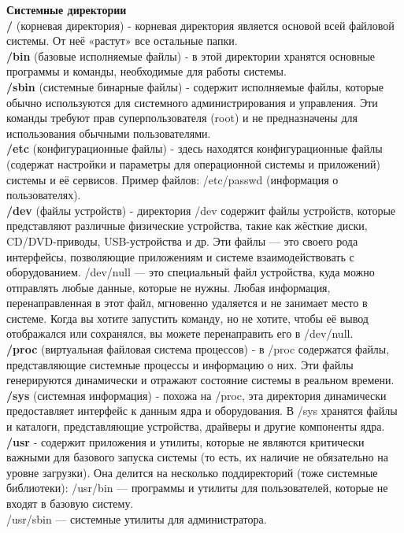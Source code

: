 \noindent \textbf{Системные директории} \\
\textbf{/} (корневая директория) -  корневая директория является основой всей файловой системы. От неё «растут» все остальные папки. \\
\textbf{/bin} (базовые исполняемые файлы) - в этой директории хранятся основные программы и команды, необходимые для работы системы. \\
\textbf{/sbin} (системные бинарные файлы) - содержит исполняемые файлы, которые обычно используются для системного администрирования и управления. Эти команды требуют прав суперпользователя (root) и не предназначены для использования обычными пользователями. \\
\textbf{/etc} (конфигурационные файлы) - здесь находятся конфигурационные файлы (содержат настройки и параметры для операционной системы и приложений) системы и её сервисов. Пример файлов: /etc/passwd (информация о пользователях). \\
\textbf{/dev} (файлы устройств) - директория /dev содержит файлы устройств, которые представляют различные физические устройства, такие как жёсткие диски, CD/DVD-приводы, USB-устройства и др. Эти файлы — это своего рода интерфейсы, позволяющие приложениям и системе взаимодействовать с оборудованием. /dev/null — это специальный файл устройства, куда можно отправлять любые данные, которые не нужны. Любая информация, перенаправленная в этот файл, мгновенно удаляется и не занимает место в системе. Когда вы хотите запустить команду, но не хотите, чтобы её вывод отображался или сохранялся, вы можете перенаправить его в /dev/null. \\
\textbf{/proc} (виртуальная файловая система процессов) - в /proc содержатся файлы, представляющие системные процессы и информацию о них. Эти файлы генерируются динамически и отражают состояние системы в реальном времени. \\
\textbf{/sys} (системная информация) - похожа на /proc, эта директория динамически предоставляет интерфейс к данным ядра и оборудования. В /sys хранятся файлы и каталоги, представляющие устройства, драйверы и другие компоненты ядра. \\
\textbf{/usr} - содержит приложения и утилиты, которые не являются критически важными для базового запуска системы (то есть, их наличие не обязательно на уровне загрузки). Она делится на несколько поддиректорий (тоже системные библиотеки):
/usr/bin — программы и утилиты для пользователей, которые не входят в базовую систему. \\
/usr/sbin — системные утилиты для администратора. \\
